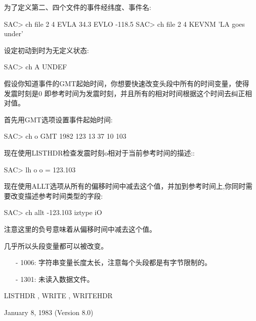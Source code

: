 为了定义第二、四个文件的事件经纬度、事件名:
\begin{SACCode}
SAC> ch file 2 4 EVLA 34.3 EVLO -118.5
SAC> ch file 2 4 KEVNM 'LA goes under'
\end{SACCode}

设定初动到时为无定义状态:
\begin{SACCode}
SAC> ch A UNDEF
\end{SACCode}

假设你知道事件的GMT起始时间，你想要快速改变头段中所有的时间变量，使得发震时刻是0
即参考时间为发震时刻，并且所有的相对时间根据这个时间去纠正相对值。

首先用GMT选项设置事件起始时间:
\begin{SACCode}
SAC> ch o GMT 1982 123 13 37 10 103
\end{SACCode}
现在使用LISTHDR检查发震时刻o相对于当前参考时间的描述::
\begin{SACCode}
SAC> lh o
 o = 123.103
\end{SACCode}
现在使用ALLT选项从所有的偏移时间中减去这个值，并加到参考时间上,你同时需要改变描述参考时间类型的字段:
\begin{SACCode}
SAC> ch allt -123.103 iztype iO
\end{SACCode}
注意这里的负号意味着从偏移时间中减去这个值。

几乎所以头段变量都可以被改变。

\begin{itemize}
\item[-]1006: 字符串变量长度太长，注意每个头段都是有字节限制的。
\item[-]1301: 未读入数据文件。
\end{itemize}

LISTHDR , WRITE , WRITEHDR

January 8, 1983 (Version 8.0)

